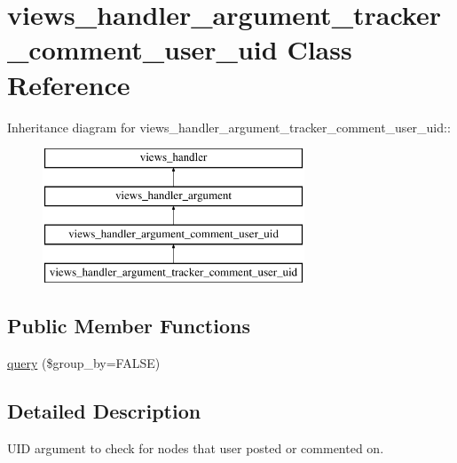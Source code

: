 \hypertarget{classviews__handler__argument__tracker__comment__user__uid}{
\section{views\_\-handler\_\-argument\_\-tracker\_\-comment\_\-user\_\-uid Class Reference}
\label{classviews__handler__argument__tracker__comment__user__uid}
}
Inheritance diagram for views\_\-handler\_\-argument\_\-tracker\_\-comment\_\-user\_\-uid::\begin{figure}[H]
\begin{center}
\leavevmode
\includegraphics[height=4cm]{classviews__handler__argument__tracker__comment__user__uid}
\end{center}
\end{figure}
\subsection*{Public Member Functions}
\begin{DoxyCompactItemize}
\item 
\hyperlink{classviews__handler__argument__tracker__comment__user__uid_aa47cdf41b905e786067d25527bca1f1f}{query} (\$group\_\-by=FALSE)
\end{DoxyCompactItemize}


\subsection{Detailed Description}
UID argument to check for nodes that user posted or commented on. 

